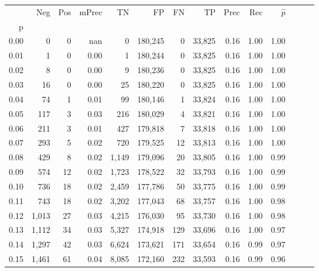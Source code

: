 \begin{tabular}{rrrrrrrrrrrrrr}
\toprule
{} &    Neg &  Pos & mPrec &       TN &       FP &      FN &      TP &  Prec &   Rec & $\hat{p}$ \\
p    &        &      &       &          &          &         &         &       &       &           \\
\midrule
0.00 &      0 &    0 &   nan &        0 &  180,245 &       0 &  33,825 &  0.16 &  1.00 &      1.00 \\
0.01 &      1 &    0 &  0.00 &        1 &  180,244 &       0 &  33,825 &  0.16 &  1.00 &      1.00 \\
0.02 &      8 &    0 &  0.00 &        9 &  180,236 &       0 &  33,825 &  0.16 &  1.00 &      1.00 \\
0.03 &     16 &    0 &  0.00 &       25 &  180,220 &       0 &  33,825 &  0.16 &  1.00 &      1.00 \\
0.04 &     74 &    1 &  0.01 &       99 &  180,146 &       1 &  33,824 &  0.16 &  1.00 &      1.00 \\
0.05 &    117 &    3 &  0.03 &      216 &  180,029 &       4 &  33,821 &  0.16 &  1.00 &      1.00 \\
0.06 &    211 &    3 &  0.01 &      427 &  179,818 &       7 &  33,818 &  0.16 &  1.00 &      1.00 \\
0.07 &    293 &    5 &  0.02 &      720 &  179,525 &      12 &  33,813 &  0.16 &  1.00 &      1.00 \\
0.08 &    429 &    8 &  0.02 &    1,149 &  179,096 &      20 &  33,805 &  0.16 &  1.00 &      0.99 \\
0.09 &    574 &   12 &  0.02 &    1,723 &  178,522 &      32 &  33,793 &  0.16 &  1.00 &      0.99 \\
0.10 &    736 &   18 &  0.02 &    2,459 &  177,786 &      50 &  33,775 &  0.16 &  1.00 &      0.99 \\
0.11 &    743 &   18 &  0.02 &    3,202 &  177,043 &      68 &  33,757 &  0.16 &  1.00 &      0.98 \\
0.12 &  1,013 &   27 &  0.03 &    4,215 &  176,030 &      95 &  33,730 &  0.16 &  1.00 &      0.98 \\
0.13 &  1,112 &   34 &  0.03 &    5,327 &  174,918 &     129 &  33,696 &  0.16 &  1.00 &      0.97 \\
0.14 &  1,297 &   42 &  0.03 &    6,624 &  173,621 &     171 &  33,654 &  0.16 &  0.99 &      0.97 \\
0.15 &  1,461 &   61 &  0.04 &    8,085 &  172,160 &     232 &  33,593 &  0.16 &  0.99 &      0.96 \\

\end{tabular}

